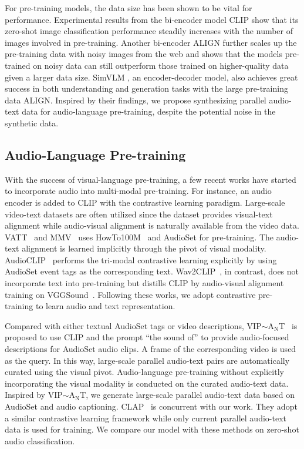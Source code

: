 \documentclass[sigconf]{acmart}
\begin{document}
For pre-training models, the data size has been shown to be vital for performance. %
Experimental results from the bi-encoder model CLIP show that its zero-shot image classification performance steadily increases with the number of images involved in pre-training.
Another bi-encoder ALIGN \citep{jia2021scaling} further scales up the pre-training data with noisy images from the web and shows that the models pre-trained on noisy data can still outperform those trained on higher-quality data given a larger data size.
SimVLM \citep{wang2021simvlm}, an encoder-decoder model, also achieves great success in both understanding and generation tasks with the large pre-training data ALIGN.
Inspired by their findings, we propose synthesizing parallel audio-text data for audio-language pre-training, despite the potential noise in the synthetic data.


\subsection{Audio-Language Pre-training}
With the success of visual-language pre-training, a few recent works have started to incorporate audio into multi-modal pre-training.
For instance, an audio encoder is added to CLIP with the contrastive learning paradigm.
Large-scale video-text datasets are often utilized since the dataset provides visual-text alignment while audio-visual alignment is naturally available from the video data.
VATT~\cite{akbari2021vatt} and MMV~\cite{alayrac2020self} uses HowTo100M~\cite{miech2019howto100m} and AudioSet for pre-training.
The audio-text alignment is learned implicitly through the pivot of visual modality.
AudioCLIP~\cite{guzhov2022audioclip} performs the tri-modal contrastive learning explicitly by using AudioSet event tags as the corresponding text.
Wav2CLIP~\cite{wu2022wav2clip}, in contrast, does not incorporate text into pre-training but distills CLIP by audio-visual alignment training on VGGSound~\cite{chen2020vggsound}.
Following these works, we adopt contrastive pre-training to learn audio and text representation.

Compared with either textual AudioSet tags or video descriptions, VIP$\sim$A$_\text{N}$T~\cite{zhao2022connecting} is proposed to use CLIP and the prompt ``the sound of'' to provide audio-focused descriptions for AudioSet audio clips.
A frame of the corresponding video is used as the query.
In this way, large-scale parallel audio-text pairs are automatically curated using the visual pivot.
Audio-language pre-training without explicitly incorporating the visual modality is conducted on the curated audio-text data.
Inspired by VIP$\sim$A$_\text{N}$T, we generate large-scale parallel audio-text data based on AudioSet and audio captioning.
CLAP~\cite{elizalde2022clap} is concurrent with our work.
They adopt a similar contrastive learning framework while only current parallel audio-text data is used for training.
We compare our model with these methods on zero-shot audio classification.
\end{document}
